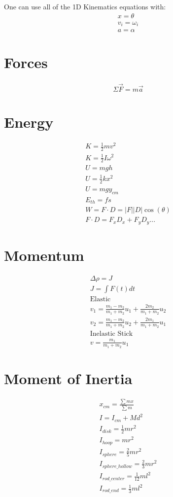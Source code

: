 \documentclass[12pt, letterpaper]{article}
\begin{document}
One can use all of the 1D Kinematics equations with:
\begin{align*}
  x = \theta \\
  v_i = \omega_i \\
  a = \alpha
\end{align*}

\section*{Forces}
\begin{align}
  \Sigma \vec{F} = m \vec{a}
\end{align}

\section*{Energy}
\begin{align}
  K = \frac{1}{2}mv^2 \\
  K = \frac{1}{2}I\omega^2 \\
  U = mgh \\
  U = \frac{1}{2}kx^2 \\
  U = mgy_{cm} \\
  E_{th} = fs \\
  W = F \cdot D = \lvert F \rvert \lvert D \rvert \cos{(\theta)} \\
  F \cdot D = F_xD_x + F_yD_y ...
\end{align}

\section*{Momentum}
\begin{align}
  \Delta\rho = J \\
  J = \int F(t)dt \\
  \text{Elastic} \\
  v_1 = \frac{m_1-m_2}{m_1+m_2}u_1 + \frac{2m_2}{m_1+m_2}u_2 \\
  v_2 = \frac{m_1-m_2}{m_1+m_2}u_2 + \frac{2m_1}{m_1+m_2}u_1 \\
  \text{Inelastic Stick} \\
  v = \frac{m_1}{m_1+m_2}u_1
\end{align}

\section*{Moment of Inertia}
\begin{align}
  x_{cm} = \frac{\sum mx}{\sum m} \\
  I = I_{cm} + Md^2 \\
  I_{disk} = \frac{1}{2}mr^2 \\
  I_{hoop} = mr^2 \\
  I_{sphere} = \frac{2}{5}mr^2 \\
  I_{sphere\_hollow} = \frac{2}{3}mr^2 \\
  I_{rod\_center} = \frac{1}{12}ml^2 \\
  I_{rod\_end} = \frac{1}{3}ml^2
\end{align}
\end{document}
